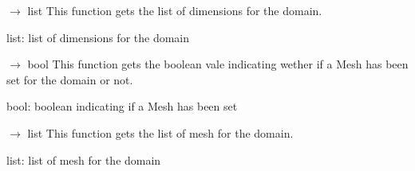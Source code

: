 \documentclass[letterpaper,10pt,english]{sphinxmanual}
\begin{document}
\begin{fulllineitems}
\begin{fulllineitems}
\end{fulllineitems}


\begin{fulllineitems}
\label{\detokenize{scrimp:scrimp.domain.Domain.get_dim}}
\pysigstartsignatures
\pysiglinewithargsret
{}
{}
{{ $\rightarrow$ list}}
\pysigstopsignatures
\sphinxAtStartPar
This function gets the list of dimensions for the domain.
\begin{description}
\sphinxAtStartPar
list: list of dimensions for the domain

\end{description}

\end{fulllineitems}


\begin{fulllineitems}
\label{\detokenize{scrimp:scrimp.domain.Domain.get_isSet}}
\pysigstartsignatures
\pysiglinewithargsret
{}
{}
{{ $\rightarrow$ bool}}
\pysigstopsignatures
\sphinxAtStartPar
This function gets the boolean vale indicating wether if a Mesh has been set for the domain or not.
\begin{description}
\sphinxAtStartPar
bool: boolean indicating if a Mesh has been set

\end{description}

\end{fulllineitems}


\begin{fulllineitems}
\label{\detokenize{scrimp:scrimp.domain.Domain.get_mesh}}
\pysigstartsignatures
\pysiglinewithargsret
{}
{}
{{ $\rightarrow$ list}}
\pysigstopsignatures
\sphinxAtStartPar
This function gets the list of mesh for the domain.
\begin{description}
\sphinxAtStartPar
list: list of mesh for the domain

\end{description}


\end{fulllineitems}
\end{fulllineitems}
\end{document}
